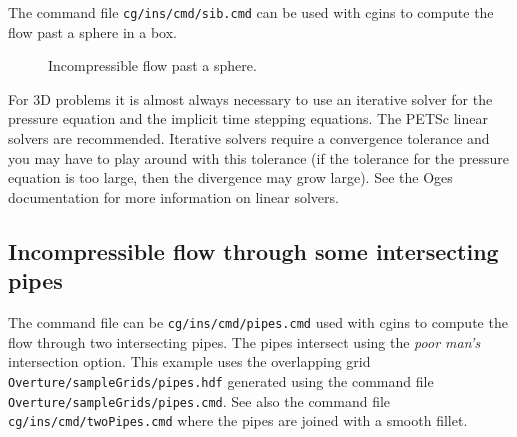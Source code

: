 \documentclass{article}
\begin{document}
The command file {\tt cg/ins/cmd/sib.cmd} can be used with cgins to compute the
flow past a sphere in a box.

{
\begin{figure}[hbt]
\newcommand{\figWidtha}{9.cm}
\newcommand{\trimfiga}[2]{\trimPlot{#1}{#2}{.0}{.0}{.08}{.025}}
\begin{center}
\end{center} 
 \caption{Incompressible flow past a sphere.}
\end{figure}
}


For 3D problems it is almost always necessary to use an iterative solver
for the pressure equation and the implicit time stepping equations. The PETSc linear
solvers are recommended. Iterative solvers require a convergence tolerance and you may
have to play around with this tolerance (if the tolerance for the pressure equation
is too large, then the divergence may grow large). 
See the Oges documentation\cite{OGES}
for more information on linear solvers.


\subsection{Incompressible flow through some intersecting pipes}

The command file can be {\tt cg/ins/cmd/pipes.cmd} 
used with cgins to compute the flow through two intersecting pipes. The pipes intersect using the
{\em poor man's} intersection option. 
This example uses the overlapping grid {\tt Overture/\-sampleGrids/\-pipes.hdf}  generated
using the command file {\tt Overture/\-sampleGrids/\-pipes.cmd}.
See also the command file {\tt cg/ins/cmd/twoPipes.cmd} where the pipes are joined with a
smooth fillet.
\end{document}
